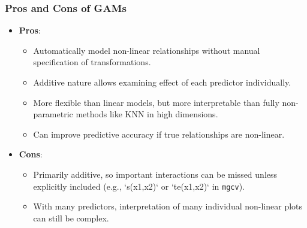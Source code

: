 \documentclass[12pt,a4paper]{article}
\newcommand{\Rpackage}[1]{\texttt{#1}} %
\begin{document}
\begin{itemize}
    \subsubsection{Pros and Cons of GAMs}
        \begin{itemize}
            \item \textbf{Pros}:
                \begin{itemize}
                    \item Automatically model non-linear relationships without manual specification of transformations.
                    \item Additive nature allows examining effect of each predictor individually.
                    \item More flexible than linear models, but more interpretable than fully non-parametric methods like KNN in high dimensions.
                    \item Can improve predictive accuracy if true relationships are non-linear.
                \end{itemize}
            \item \textbf{Cons}:
                \begin{itemize}
                    \item Primarily additive, so important interactions can be missed unless explicitly included (e.g., `s(x1,x2)` or `te(x1,x2)` in \Rpackage{mgcv}).
                    \item With many predictors, interpretation of many individual non-linear plots can still be complex.
                \end{itemize}
        \end{itemize}

\end{itemize}
\end{document}
